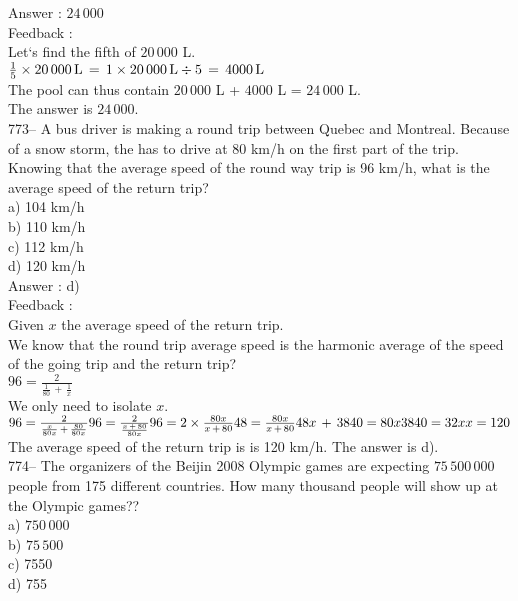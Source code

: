 \documentclass[letterpaper, 12pt]{article}
\begin{document}
Answer : $24\,000$ \\

Feedback : \\
Let`s find the fifth of $20\,000$ L.\\
$\frac{1}{5}\times 20\,000
\textrm{\,L}\,=\,1\times20\,000\,\textrm{L}\div5\,=\,4000\,\textrm{L}$\\
The pool can thus contain $20\,000$ L + $4000$ L = $24\,000$ L.\\
The answer is $24\,000$.\\

773-- A bus driver is making a round trip between Quebec and Montreal. Because of a snow storm, the has to drive at 80 km/h on the first part of the trip. Knowing that the average speed of the round way trip is 96 km/h, what is the average speed of the return trip?\\
a) 104 km/h\\
b) 110 km/h\\
c) 112 km/h\\
d) 120 km/h\\

Answer : d)\\

Feedback : \\
Given $x$ the average speed of the return trip.\\
We know that the round trip average speed is the harmonic average of the speed of the going trip and the return trip?\\[2mm]
$96=\frac{2}{\frac{1}{80}\,+\,\frac{1}{x}}$\\[2mm]
We only need to isolate $x$.\\[2mm]
$96=\frac{2}{\frac{x}{80x}\,+\,\frac{80}{80x}}\\[2mm]
96=\frac{2}{\frac{x\,+\,80}{80x}}\\[2mm]
96=2\times\frac{80x}{x\,+\,80}\\[2mm]
48=\frac{80x}{x\,+\,80}\\[2mm]
48x\,+\,3840=80x\\[2mm]
3840=32x\\[2mm]
x=120$\\[2mm]
The average speed of the return trip is is 120 km/h.  The answer is d).\\

774-- The organizers of the Beijin 2008 Olympic games are expecting $75\,500\,000$ people from 175 different countries. How many thousand people will show up at the Olympic games??\\
a) $750\,000$\\
b) $75\,500$\\
c) 7550\\
d) 755\\
\end{document}
